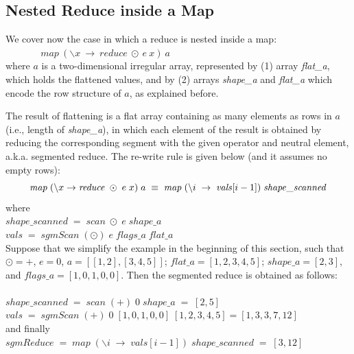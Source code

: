 \subsection{Nested Reduce inside a Map}
\label{chapter:section:flattening:reduce}

We cover now the case in which a reduce is nested inside a map:\\
$\mbox{~~~~~~~~~~~}\mathit{map}~(\backslash x~\rightarrow~\mathit{reduce}~\odot~e~x)~a$\\
where $a$ is a two-dimensional irregular array, represented by (1) array \textit{flat\_a}, which holds the flattened values, and by (2) arrays \textit{shape\_a} and \textit{flat\_a} which encode the row structure of $a$, as explained before.

The result of flattening is a flat array containing as many elements as rows in $a$ (i.e., length of \textit{shape\_a}), in which each element of the result is obtained by reducing the corresponding segment with the given operator and neutral element, a.k.a. segmented reduce. The re-write rule is given below (and it assumes no empty rows):
\begin{equation}
\centering
\nonumber
\mathit{map}\;(\backslash x\rightarrow \mathit{reduce}\;\odot\;e\;x)\;a\;
\equiv\;
\mathit{map}\;(\backslash i\;\rightarrow\;\mathit{vals}[i-1])\;\mathit{shape\_scanned}
\end{equation}
where\\
$\mathit{shape\_scanned}\;=\;\mathit{scan}\;\odot\;e\;\mathit{shape\_a}$\\
$\mathit{vals}\;=\;\mathit{sgmScan}\;(\odot)\;e\;\mathit{flags\_a}\;\mathit{flat\_a}$\\

Suppose that we simplify the example in the beginning of this section, such that $\odot=+$, $e=0$, $a=[[1,2],[3,4,5]]$; $\mathit{flat\_a}=[1,2,3,4,5]$; $\mathit{shape\_a}=[2,3]$, and $\mathit{flags\_a}=[1,0,1,0,0]$. Then the segmented reduce is obtained as follows:\\\\
$\mathit{shape\_scanned}\;=\;\mathit{scan}\;(+)\;0\;\mathit{shape\_a}\;=\;[2,5]$\\
$\mathit{vals}\;=\;\mathit{sgmScan}\;(+)\;0\;[1,0,1,0,0]\;[1,2,3,4,5]=[1,3,3,7,12]$\\
and finally\\
$\mathit{sgmReduce}\;=\;\mathit{map}\;(\backslash i\;\rightarrow\;\mathit{vals}[i-1])\;\mathit{shape\_scanned}\;=\;[3,12]$

